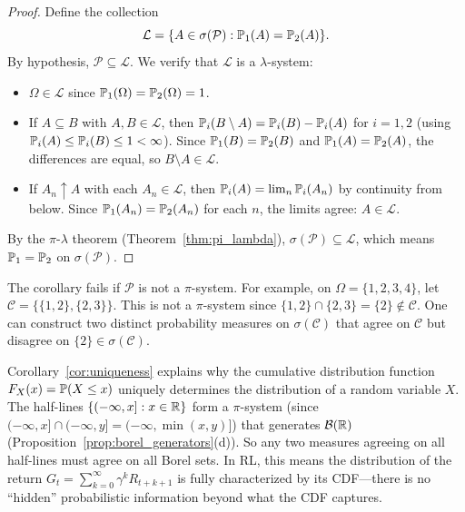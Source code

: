 \documentclass[11pt,a4paper]{article}
\begin{document}
\begin{proof}
Define the collection
\begin{equation}
  \mathcal{L} = \{A \in \sigma(\mathcal{P}) :
    \mathbb{P}_1(A) = \mathbb{P}_2(A)\}.
\end{equation}
By hypothesis, $\mathcal{P} \subseteq \mathcal{L}$. We verify that
$\mathcal{L}$ is a $\lambda$-system:
\begin{itemize}[nosep]
  \item $\Omega \in \mathcal{L}$ since
    $\mathbb{P}_1(\Omega) = \mathbb{P}_2(\Omega) = 1$.
  \item If $A \subseteq B$ with $A, B \in \mathcal{L}$, then
    $\mathbb{P}_i(B \setminus A) = \mathbb{P}_i(B) - \mathbb{P}_i(A)$ for $i = 1, 2$
    (using $\mathbb{P}_i(A) \leq \mathbb{P}_i(B) \leq 1 < \infty$). Since
    $\mathbb{P}_1(B) = \mathbb{P}_2(B)$ and $\mathbb{P}_1(A) = \mathbb{P}_2(A)$, the
    differences are equal, so $B \setminus A \in \mathcal{L}$.
  \item If $A_n \uparrow A$ with each $A_n \in \mathcal{L}$, then
    $\mathbb{P}_i(A) = \lim_{n} \mathbb{P}_i(A_n)$ by continuity from below.
    Since $\mathbb{P}_1(A_n) = \mathbb{P}_2(A_n)$ for each $n$, the limits agree:
    $A \in \mathcal{L}$.
\end{itemize}
By the $\pi$-$\lambda$ theorem (Theorem~\ref{thm:pi_lambda}),
$\sigma(\mathcal{P}) \subseteq \mathcal{L}$, which means
$\mathbb{P}_1 = \mathbb{P}_2$ on $\sigma(\mathcal{P})$.
\end{proof}

\begin{warning}[title={The $\pi$-System Hypothesis is Essential}]
The corollary fails if $\mathcal{P}$ is not a $\pi$-system. For
example, on $\Omega = \{1, 2, 3, 4\}$, let
$\mathcal{C} = \bigl\{\{1,2\}, \{2,3\}\bigr\}$. This is not a
$\pi$-system since $\{1,2\} \cap \{2,3\} = \{2\} \notin \mathcal{C}$.
One can construct two distinct probability measures on
$\sigma(\mathcal{C})$ that agree on $\mathcal{C}$ but disagree on
$\{2\} \in \sigma(\mathcal{C})$.
\end{warning}

\begin{rlconnection}[title={CDFs Determine Distributions}]
Corollary~\ref{cor:uniqueness} explains why the cumulative distribution
function $F_X(x) = \mathbb{P}(X \leq x)$ uniquely determines the
distribution of a random variable $X$. The half-lines
$\{(-\infty, x] : x \in \mathbb{R}\}$ form a $\pi$-system (since
$(-\infty, x] \cap (-\infty, y] = (-\infty, \min(x,y)]$)
that generates $\mathcal{B}(\mathbb{R})$
(Proposition~\ref{prop:borel_generators}(d)). So any two measures
agreeing on all half-lines must agree on all Borel sets. In RL, this
means the distribution of the return $G_t = \sum_{k=0}^\infty
\gamma^k R_{t+k+1}$ is fully characterized by its CDF---there is no
``hidden'' probabilistic information beyond what the CDF captures.
\end{rlconnection}
\end{document}
